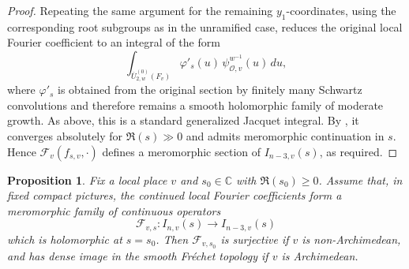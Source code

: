 \documentclass[11pt,notitlepage]{amsart}
\newtheorem{proposition}[theorem]{Proposition}
\theoremstyle{definition}
\theoremstyle{remark}
\newcommand{\calF}{\mathcal{F}}
\newcommand{\calO}{\mathcal{O}}
\begin{document}
\begin{proof}
Repeating the same argument for the remaining \(y_1\)-coordinates, using the
corresponding root subgroups as in the unramified case, reduces the original local Fourier
coefficient to an integral of the form
\[
  \int_{\overline U^{(0)}_{2,w}(F_v)}
    \varphi'_{s}(u)\,
    \psi^{w^{-1}}_{\calO,v}(u)\,du ,
\]
where \(\varphi'_s\) is obtained from the original section by finitely many Schwartz
convolutions and therefore remains a smooth holomorphic family of moderate
growth. As above, this is a standard generalized Jacquet integral. By \cite{J67}, it converges
absolutely for \(\Re(s)\gg0\) and admits meromorphic continuation in \(s\).
Hence \(\calF_v(f_{s,v},\cdot)\) defines a meromorphic section of
\(I_{n-3,v}(s)\), as required.
\end{proof}

\begin{proposition}\label{prop4}
Fix a local place \(v\) and \(s_0\in\mathbb C\) with
\(\Re(s_0)\geq0\). Assume that, in fixed compact pictures, the continued
local Fourier coefficients form a meromorphic family of continuous
operators
\[
\calF_{v,s}:I_{n,v}(s)\longrightarrow I_{n-3,v}(s)
\]
which is holomorphic at \(s=s_0\). Then \(\calF_{v,s_0}\) is surjective if \(v\) is non-Archimedean, and has dense image in the smooth
Fr\'echet topology if \(v\) is Archimedean.
\end{proposition}
\end{document}
